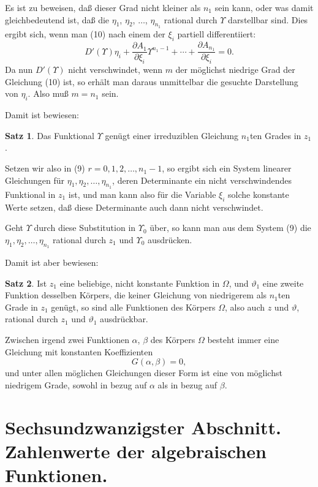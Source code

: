 \documentclass[12pt,a4paper]{article}
\theoremstyle{definition}
\newtheorem{satz}{Satz}[section]
\begin{document}
Es ist zu beweisen, daß dieser Grad nicht kleiner als $n_1$ sein kann, oder was damit gleichbedeutend ist, daß die $\eta_1$, $\eta_2$, $\ldots$, $\eta_{n_1}$ rational durch $\Upsilon$ darstellbar sind. Dies ergibt sich, wenn man (10) nach einem der $\xi_i$ partiell differentiiert:
\[D'(\Upsilon)\eta_i + \frac{\partial A_1}{\partial\xi_i}\Upsilon^{n_1-1} + \cdots + \frac{\partial A_{n_1}}{\partial\xi_i} = 0.\]
Da nun $D'(\Upsilon)$ nicht verschwindet, wenn $m$ der möglichst niedrige Grad der Gleichung (10) ist, so erhält man daraus unmittelbar die gesuchte Darstellung von $\eta_i$. Also muß $m = n_1$ sein.

Damit ist bewiesen:

\begin{satz}
Das Funktional $\Upsilon$ genügt einer irreduziblen Gleichung $n_1$ten Grades in $z_1$.
\end{satz}

Setzen wir also in (9) $r = 0, 1, 2, \ldots, n_1-1$, so ergibt sich ein System linearer Gleichungen für $\eta_1, \eta_2, \ldots, \eta_{n_1}$, deren Determinante ein nicht verschwindendes Funktional in $z_1$ ist, und man kann also für die Variable $\xi_i$ solche konstante Werte setzen, daß diese Determinante auch dann nicht verschwindet.

Geht $\Upsilon$ durch diese Substitution in $\Upsilon_0$ über, so kann man aus dem System (9) die $\eta_1, \eta_2, \ldots, \eta_{n_1}$ rational durch $z_1$ und $\Upsilon_0$ ausdrücken.

Damit ist aber bewiesen:

\begin{satz}
Ist $z_1$ eine beliebige, nicht konstante Funktion in $\Omega$, und $\vartheta_1$ eine zweite Funktion desselben Körpers, die keiner Gleichung von niedrigerem als $n_1$ten Grade in $z_1$ genügt, so sind alle Funktionen des Körpers $\Omega$, also auch $z$ und $\vartheta$, rational durch $z_1$ und $\vartheta_1$ ausdrückbar.
\end{satz}

Zwischen irgend zwei Funktionen $\alpha$, $\beta$ des Körpers $\Omega$ besteht immer eine Gleichung mit konstanten Koeffizienten
\[G(\alpha, \beta) = 0,\]
und unter allen möglichen Gleichungen dieser Form ist eine von möglichst niedrigem Grade, sowohl in bezug auf $\alpha$ als in bezug auf $\beta$.

\newpage
\section*{Sechsundzwanzigster Abschnitt. Zahlenwerte der algebraischen Funktionen.}
\end{document}
